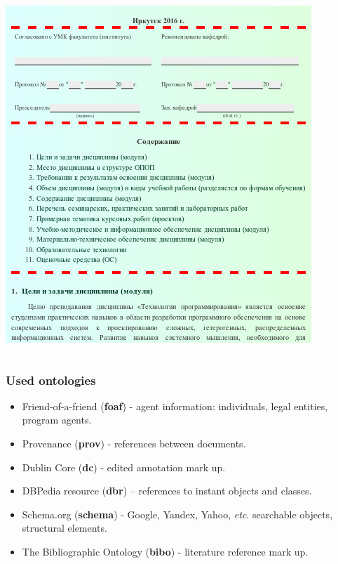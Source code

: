 \documentclass[10pt]{beamer}
\begin{document}
\begin{frame}
\begin{adjustwidth}{-2.5em}{-2.5em}
\begin{center}
\begin{columns}
\begin{column}{0.5\linewidth}
          \includegraphics[width=1\linewidth]{work-program-agreement.jpg}
        \end{column}
    \end{columns}
    \end{center}
  \end{adjustwidth}
\end{frame}

\begin{frame}
  \frametitle{Used ontologies}
  \begin{itemize}
  \item Friend-of-a-friend (\textbf{foaf}) - agent information: individuals, legal entities, program agents.
  \item Provenance (\textbf{prov}) - references between documents.
  \item Dublin Core (\textbf{dc}) - edited annotation mark up.
  \item DBPedia resource (\textbf{dbr}) – references to instant objects and classes.
  \item Schema.org (\textbf{schema}) - Google, Yandex, Yahoo, \emph{etc}. searchable objects, structural elements.
  \item The Bibliographic Ontology (\textbf{bibo}) - literature reference mark up.
\end{itemize}
\end{frame}
\end{document}

